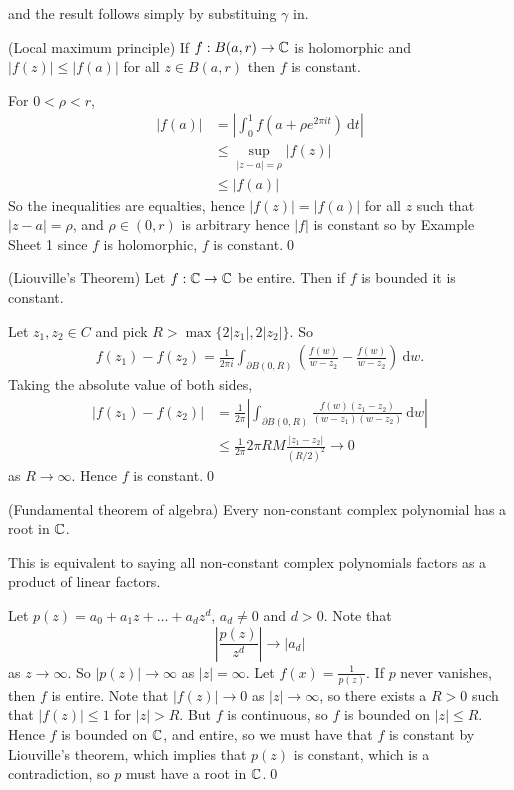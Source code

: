 \documentclass{article}
\begin{document}
and the result follows simply by substituing $ \gamma $ in.
\begin{corollary}
	(Local maximum principle) If $ f: B(a,r)\to \mathbb{C} $ is holomorphic and $ |f(z)|\le |f(a)| $ for all $ z\in B(a,r) $ then $ f $ is constant.
\end{corollary}
\pf For $ 0<\rho<r $,
\begin{align*}
	|f(a)| &= \left|\int_0^1 f(a+\rho e^{2\pi it})\ \mathrm dt\right|\\
	       &\le \sup_{|z-a|=\rho}|f(z)|\\
	       &\le |f(a)|
\end{align*}
So the inequalities are equalties, hence $ |f(z)| = |f(a)| $ for all $ z $ such that $ |z-a|=\rho $, and $ \rho \in (0,r) $ is arbitrary hence $ |f| $ is constant so by Example Sheet 1 since $ f $ is holomorphic, $ f $ is constant.\qed
\begin{theorem}
	(Liouville's Theorem) Let $ f:\mathbb{C}\to\mathbb{C} $ be entire. Then if $ f $ is bounded it is constant.
\end{theorem}
\pf Let $ z_1,z_2\in C $ and pick $ R>\max\{2|z_1|,2|z_2|\} $. So
\begin{align*}
	f(z_1)-f(z_2) =\frac 1{2\pi i} \int_{\partial B(0,R)}\left(\frac{f(w)}{w-z_2}-\frac{f(w)}{w-z_2}\right)\ \mathrm dw. 
\end{align*}
Taking the absolute value of both sides,
\begin{align*}
	|f(z_1)-f(z_2)| &= \frac 1{2\pi}\left|\int_{\partial B(0,R)}\frac{f(w)(z_1-z_2)}{(w-z_1)(w-z_2)}\ \mathrm dw\right|\\
			&\le \frac 1{2\pi} 2\pi RM\frac{|z_1-z_2|}{(R/2)^2}\to 0
\end{align*}
as $ R\to\infty $. Hence $ f $ is constant.\qed
\begin{corollary}
	(Fundamental theorem of algebra) Every non-constant complex polynomial has a root in $ \mathbb{C} $.
\end{corollary}
\begin{remark}
  This is equivalent to saying all non-constant complex polynomials factors as a product of linear factors.
\end{remark}
\pf Let $ p(z) = a_0 + a_1z+ \dots + a_d z^d $, $ a_d\ne 0 $ and $ d>0 $. Note that
\[
	\left|\frac{p(z)}{z^d}\right| \to |a_d|
\]
as $ z\to\infty $. So $ |p(z)|\to\infty $ as $ |z| = \infty $. Let $ f(x) = \frac 1{p(z)} $. If $ p $ never vanishes, then $ f $ is entire. Note that $ |f(z)|\to 0 $ as $ |z|\to\infty $, so there exists a $ R>0 $ such that $ |f(z)|\le 1 $ for $ |z|>R $. But $ f $ is continuous, so $ f $ is bounded on $ |z|\le R $. Hence $ f $ is bounded on $ \mathbb{C} $, and entire, so we must have that $ f $ is constant by Liouville's theorem, which implies that $ p(z) $ is constant, which is a contradiction, so $ p $ must have a root in $ \mathbb{C} $.\qed
\end{document}
